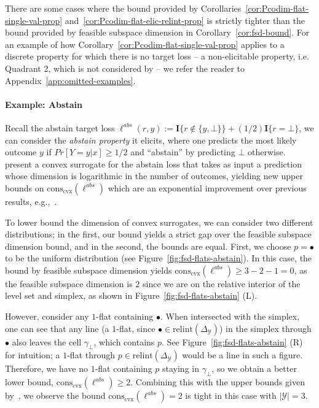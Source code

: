 \documentclass[11pt]{article} %
\newcommand{\Comments}{1}
\newcommand{\mytodo}[2]{\ifnum\Comments=1%
	\todo[linecolor=#1!80!black,backgroundcolor=#1,bordercolor=#1!80!black]{#2}\fi}
\newcommand{\raft}[1]{\mytodo{green!20!white}{RF: #1}}
\newcommand{\jessiet}[1]{\mytodo{purple!20!white}{JF: #1}}
\newcommand{\simplex}{\Delta_\Y}
\newcommand{\relint}[1]{\mathrm{relint}(#1)}
\newcommand{\conscvx}{\mathrm{cons}_\mathrm{cvx}}
\newcommand{\Y}{\mathcal{Y}}
\newcommand{\Ind}[1]{\mathbf{I}\{{#1}\}}
\begin{document}
There are some cases where the bound provided by Corollaries~\ref{cor:Pcodim-flat-single-val-prop} and~\ref{cor:Pcodim-flat-elic-relint-prop} is strictly tighter than the bound provided by feasible subspace dimension in Corollary~\ref{cor:fsd-bound}.
For an example of how Corollary~\ref{cor:Pcodim-flat-single-val-prop} applies to a discrete property for which there is no target loss -- a non-elicitable property, i.e. Quadrant 2, which is not considered by \citet{ramaswamy2018consistent} -- we refer the reader to Appendix~\ref{app:omitted-examples}.

\paragraph{Example: Abstain}\label{subsec:examples-finite}
Recall the abstain target loss $\ell^{abs}(r,y) := \Ind{r \not \in \{y, \bot\}} + (1/2)\Ind{r = \bot}$,  we can consider the \emph{abstain property} it elicits, where one predicts the most likely outcome $y$ if $Pr[Y=y|x] \geq 1/2$ and ``abstain'' by predicting $\bot$ otherwise.
\citet{ramaswamy2016convex} present a convex surrogate for the abstain loss that takes as input a prediction whose dimension is logarithmic in the number of outcomes, yielding new upper bounds on $\conscvx(\ell^{abs})$ which are an exponential improvement over previous results, e.g.,~\cite{crammer2001algorithmic}.

To lower bound the dimension of convex surrogates, we can consider two different distributions; in the first, our bound yields a strict gap over the feasible subspace dimension bound, and in the second, the bounds are equal.
First, we choose $p = \bullet$ to be the uniform distribution (see Figure~\ref{fig:fsd-flats-abstain}).
In this case, the bound by feasible subspace dimension yields $\conscvx(\ell^{abs}) \geq 3 - 2 - 1 = 0$, as the feasible subspace dimension is $2$ since we are on the relative interior of the level set and simplex, as shown in Figure~\ref{fig:fsd-flats-abstain} (L).


However, consider any $1$-flat containing $\bullet$.
When intersected with the simplex, one can see that any line (a $1$-flat, since $\bullet \in \relint{\simplex}$) in the simplex through $\bullet$ also leaves the cell $\gamma_\bot$, which contains $p$.
See Figure~\ref{fig:fsd-flats-abstain} (R) for intuition; a $1$-flat through $p \in \relint{\simplex}$ would be a line in such a figure.
Therefore, we have no $1$-flat containing $p$ staying in $\gamma_\bot$, so we obtain a better lower bound, $\conscvx(\ell^{abs}) \geq 2$.
Combining this with the upper bounds given by~\cite{ramaswamy2018consistent}, we observe the bound $\conscvx(\ell^{abs}) = 2$ is tight in this case with $|\Y|=3$.
\end{document}
